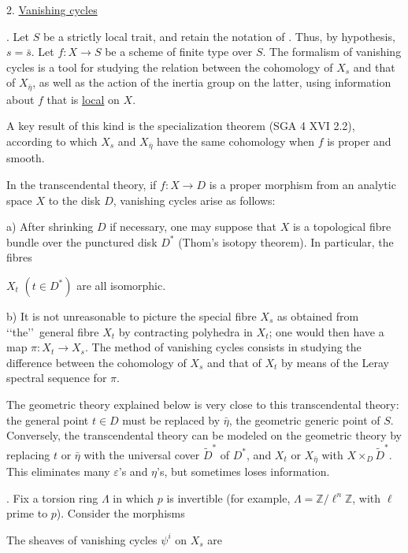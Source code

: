 
2. \underline{Vanishing cycles}

. Let $S$ be a strictly local trait, and retain the notation of . Thus, by hypothesis, $s=\bar s$. Let $f:X\longrightarrow S$ be a scheme of finite type over $S$. The formalism of vanishing cycles is a tool for studying the relation between the cohomology of $X_s$ and that of $X_{\bar\eta}$, as well as the action of the inertia group on the latter, using information about $f$ that is \underline{local} on $X$.

A key result of this kind is the specialization theorem (SGA 4 XVI 2.2), according to which $X_s$ and $X_{\bar\eta}$ have the same cohomology when $f$ is proper and smooth.

In the transcendental theory, if $f:X\longrightarrow D$ is a proper morphism from an analytic space $X$ to the disk $D$, vanishing cycles arise as follows:

a) After shrinking $D$ if necessary, one may suppose that $X$ is a topological fibre bundle over the punctured disk $D^*$ (Thom's isotopy theorem). In particular, the fibres


$X_t$ $(t\in D^*)$ are all isomorphic.

b) It is not unreasonable to picture the special fibre $X_s$ as obtained from \lq\lq the\rq\rq\ general fibre $X_t$ by contracting polyhedra in $X_t$; one would then have a map $\pi:X_t\longrightarrow X_s$. The method of vanishing cycles consists in studying the difference between the cohomology of $X_s$ and that of $X_t$ by means of the Leray spectral sequence for $\pi$.

The geometric theory explained below is very close to this transcendental theory: the general point $t\in D$ must be replaced by $\bar\eta$, the geometric generic point of $S$. Conversely, the transcendental theory can be modeled on the geometric theory by replacing $t$ or $\bar\eta$ with the universal cover $\widetilde D^*$ of $D^*$, and $X_t$ or $X_{\bar\eta}$ with $X\times_D\widetilde D^*$. This eliminates many $\varepsilon$'s and $\eta$'s, but sometimes loses information.

. Fix a torsion ring $\Lambda$ in which $p$ is invertible (for example, $\Lambda=\mathbb Z/\ell^n\mathbb Z$, with $\ell$ prime to $p$). Consider the morphisms

\begin{center}
\end{center}
The sheaves of vanishing cycles $\psi^i$ on $X_s$ are

